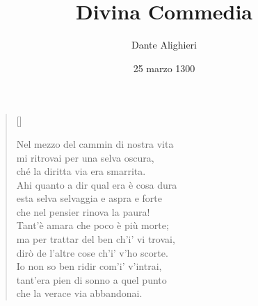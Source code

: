 \documentclass{article}
\title{Divina Commedia}
\author{Dante Alighieri}
\date{25 marzo 1300}
\begin{document}
\maketitle

\large

\settowidth{\versewidth}{Nel mezzo del cammin di nostra vita}

\begin{verse}[\versewidth]
  \begin{patverse*}
    Nel mezzo del cammin di nostra vita\\
    mi ritrovai per una selva oscura,\\
    ché la diritta via era smarrita.\\
    Ahi quanto a dir qual era è cosa dura\\
    esta selva selvaggia e aspra e forte\\
    che nel pensier rinova la paura!\\
    Tant'è amara che poco è più morte;\\
    ma per trattar del ben ch'i' vi trovai,\\
    dirò de l'altre cose ch'i' v'ho scorte.\\
    Io non so ben ridir com'i' v'intrai,\\
    tant'era pien di sonno a quel punto\\
    che la verace via abbandonai.
  \end{patverse*}
\end{verse}
\end{document}
